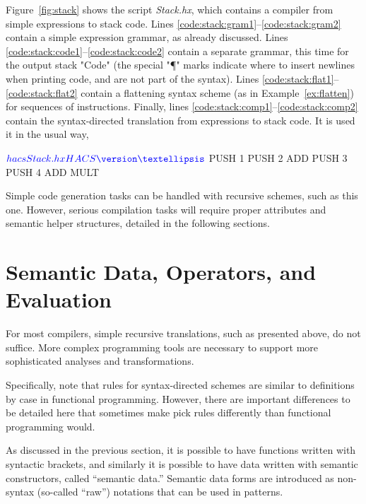 \documentclass[11pt]{article} %
\begin{document}
\begin{example}\label{ex:stack}
  Figure~\ref{fig:stack} shows the \HAX script \emph{Stack.hx}, which contains a compiler from
  simple expressions to stack code. Lines \ref{code:stack:gram1}--\ref{code:stack:gram2} contain a
  simple expression grammar, as already discussed. Lines
  \ref{code:stack:code1}--\ref{code:stack:code2} contain a separate grammar, this time for the
  output stack "Code" (the special "¶" marks indicate where to insert newlines when printing code,
  and are not part of the syntax). Lines \ref{code:stack:flat1}--\ref{code:stack:flat2} contain a
  flattening syntax scheme (as in Example~\ref{ex:flatten}) for sequences of instructions.  Finally,
  lines \ref{code:stack:comp1}--\ref{code:stack:comp2} contain the syntax-directed translation from
  expressions to stack code. It is used it in the usual way,
  \begin{code}[commandchars=\\\{\}]
$ \textcolorinput{hacs Stack.hx}
HACS \version
…
$ 
  PUSH 1 
  PUSH 2 
  ADD 
  PUSH 3 
  PUSH 4 
  ADD 
  MULT 
  \end{code}
  Simple code generation tasks can be handled with recursive schemes, such as this one. However,
  serious compilation tasks will require proper attributes and semantic helper structures, detailed
  in the following sections.
\end{example}


\section{Semantic Data, Operators, and Evaluation}
\label{sec:eval}

For most compilers, simple recursive translations, such as presented above, do not suffice. More
complex programming tools are necessary to support more sophisticated analyses and transformations.

Specifically, note that rules for syntax-directed schemes are similar to definitions by case in
functional programming. However, there are important differences to be detailed here that sometimes
make \HAX pick rules differently than functional programming would.

As discussed in the previous section, it is possible to have functions written with syntactic
brackets, and similarly it is possible to have data written with semantic constructors, called
``semantic data.''  Semantic data forms are introduced as non-syntax (so-called ``raw'') notations
that can be used in patterns.
\end{document}
